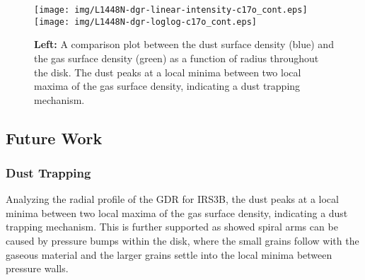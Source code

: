 \documentclass[preprint,12pt]{aastex62}
\begin{document}
\begin{figure}[H]
\begin{center}
\texttt{[image: img/L1448N-dgr-linear-intensity-c17o\_cont.eps]}
\texttt{[image: img/L1448N-dgr-loglog-c17o\_cont.eps]}
\end{center}   
\caption{\textbf{Left:} A comparison plot between the dust surface density (blue) and the gas surface density (green) as a function of radius throughout the disk. The dust peaks at a local minima between two local maxima of the gas surface density, indicating a dust trapping mechanism.}\label{fig:gdr}
\end{figure}


\subsection{Future Work}
\subsubsection*{Dust Trapping}
Analyzing the radial profile of the GDR for IRS3B, the dust peaks at a local minima between two local maxima of the gas surface density, indicating a dust trapping mechanism. This is further supported as \citet{2015MNRAS.451..974D} showed spiral arms can be caused by pressure bumps within the disk, where the small grains follow with the gaseous material and the larger grains settle into the local minima between pressure walls. 
\end{document}
